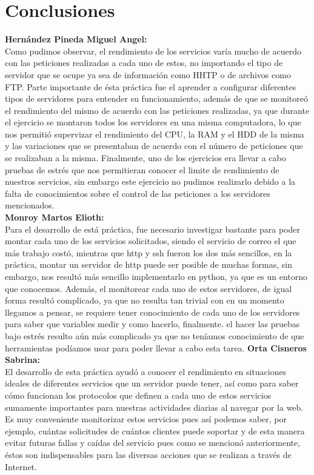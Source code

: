 \chapter{Conclusiones}
\noindent
\textbf{Hernández Pineda Miguel Angel:}\\
Como pudimos observar, el rendimiento de los servicios varía mucho de acuerdo con las peticiones realizadas a cada uno de estos, no importando el tipo de servidor que se ocupe ya sea de información como HHTP o de archivos como FTP. Parte importante de ésta práctica fue el aprender a configurar diferentes tipos de servidores para entender su funcionamiento, además de que se monitoreó el rendimiento del mismo de acuerdo con las peticiones realizadas, ya que durante el ejercicio se montaron todos los servidores en una misma computadora, lo que nos permitió supervizar el rendimiento del CPU, la RAM y el HDD de la misma y las variaciones que se presentaban de acuerdo con el número de peticiones que se realizaban a la misma. Finalmente, uno de los ejercicios era llevar a cabo pruebas de estrés que nos permitieran conocer el limite de rendimiento de nuestros servicios, sin embargo este ejercicio no pudimos realizarlo debido a la falta de conocimientos sobre el control de las peticiones a los servidores mencionados.
\noindent
\\
\textbf{Monroy Martos Elioth:}\\
Para el desarrollo de está práctica, fue necesario investigar bastante para poder montar cada uno de los servicios solicitados, siendo el servicio de correo el que más trabajo costó, mientras que http y ssh fueron los dos más sencillos, en la práctica, montar un servidor de http puede ser posible de muchas formas, sin embargo, nos resultó más sencillo implementarlo en python, ya que es un entorno que conocemos. Además, el monitorear cada uno de estos servidores, de igual forma resultó complicado, ya que no resulta tan trivial con en un momento llegamos a pensar, se requiere tener conocimiento de cada uno de los servidores para saber que variables medir y como hacerlo, finalmente. el hacer las pruebas bajo estrés resulto aún más complicado ya que no teníamos conocimiento de que herramientas podíamos usar para poder llevar a cabo esta tarea.
\clearpage
\noindent
\textbf{Orta Cisneros Sabrina:}\\
\noindent
El desarrollo de esta práctica ayudó a conocer el rendimiento en situaciones ideales de diferentes servicios que un servidor puede tener, así como para saber cómo funcionan los protocolos que definen a cada uno de estos servicios sumamente importantes para nuestras actividades diarias al navegar por la web. Es muy conveniente monitorizar estos servicios pues así podemos saber, por ejemplo, cuántas solicitudes de cuántos clientes puede soportar y de esta manera evitar futuras fallas y caídas del servicio pues como se mencionó anteriormente, éstos son indispensables para las diversas acciones que se realizan a través de Internet.
